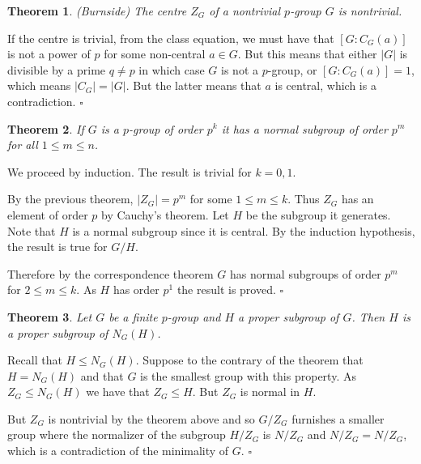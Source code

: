 \documentclass[10pt]{article}
\newtheorem{theorem}{Theorem}[section]
\newenvironment{proof}[1][Proof]{\begin{trivlist}
\item[\hskip \labelsep {\itshape #1}]}{\end{trivlist}}
\begin{document}
\begin{theorem} (Burnside)
The centre $Z_G$ of a nontrivial $p$-group $G$ is nontrivial.
\end{theorem}

\begin{proof}
If the centre is trivial, from the class equation, we must have that $[G:C_G(a)]$ is not a power of $p$ for some non-central $a \in G$. But this means that either $|G|$ is divisible by a prime $q \neq p$ in which case $G$ is not a $p$-group, or $[G:C_G(a)] = 1$, which means $|C_G| = |G|$. But the latter means that $a$ is central, which is a contradiction. $\square$
\end{proof}

\begin{theorem} \label{pgroupsubs}
If $G$ is a $p$-group of order $p^k$ it has a normal subgroup of order $p^m$ for all $1 \leq m \leq n$.
\end{theorem}

\begin{proof}
We proceed by induction. The result is trivial for $k = 0, 1$.

By the previous theorem, $|Z_G| = p^m$ for some $1 \leq m \leq k$. Thus $Z_G$ has an element of order $p$ by Cauchy's theorem. Let $H$ be the subgroup it generates. Note that $H$ is a normal subgroup since it is central. By the induction hypothesis, the result is true for $G/H$.

Therefore by the correspondence theorem $G$ has normal subgroups of order $p^m$ for $2 \leq m \leq k$. As $H$ has order $p^1$ the result is proved. $\square$
\end{proof}

\begin{theorem}
Let $G$ be a finite $p$-group and $H$ a proper subgroup of $G$. Then $H$ is a proper subgroup of $N_G(H)$.
\end{theorem}

\begin{proof}
Recall that $H \leq N_G(H)$. Suppose to the contrary of the theorem that $H = N_G(H)$ and that $G$ is the smallest group with this property. As $Z_G \leq N_G(H)$ we have that $Z_G \leq H$. But $Z_G$ is normal in $H$.

But $Z_G$ is nontrivial by the theorem above and so $G/Z_G$ furnishes a smaller group where the normalizer of the subgroup $H/Z_G$ is $N/Z_G$ and $N/Z_G = N/Z_G$, which is a contradiction of the minimality of $G$. $\square$
\end{proof}
\end{document}
